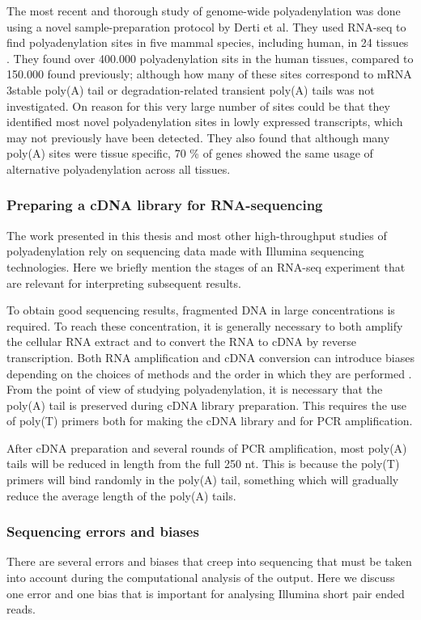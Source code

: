 The most recent and thorough study of genome-wide polyadenylation was done
using a novel sample-preparation protocol by Derti et al. They used RNA-seq to
find polyadenylation sites in five mammal species, including human, in 24
tissues \cite{derti_quantitative_2012}. They found over 400.000 polyadenylation
sits in the human tissues, compared to 150.000 found previously; although how
many of these sites correspond to mRNA 3\p stable poly(A) tail or
degradation-related transient poly(A) tails was not investigated. On reason for
this very large number of sites could be that they identified most novel
polyadenylation sites in lowly expressed transcripts, which may not previously
have been detected. They also found that although many poly(A) sites were
tissue specific, 70 \% of genes showed the same usage of alternative
polyadenylation across all tissues.

\subsubsection{Preparing a cDNA library for RNA-sequencing}
The work presented in this thesis and most other high-throughput studies of
polyadenylation rely on sequencing data made with Illumina sequencing
technologies. Here we briefly mention the stages of an RNA-seq
experiment that are relevant for interpreting subsequent results.

To obtain good sequencing results, fragmented DNA in large concentrations is
required. To reach these concentration, it is generally necessary to both
amplify the cellular RNA extract and to convert the RNA to cDNA by reverse
transcription. Both RNA amplification and cDNA conversion can introduce biases
depending on the choices of methods and the order in which they are performed
\cite{wang_rna-seq:_2009}. From the point of view of studying polyadenylation,
it is necessary that the poly(A) tail is preserved during cDNA library
preparation. This requires the use of poly(T) primers both for making the cDNA
library and for PCR amplification.

After cDNA preparation and several rounds of PCR amplification, most poly(A)
tails will be reduced in length from the full 250 nt. This is because the
poly(T) primers will bind randomly in the poly(A) tail, something which will
gradually reduce the average length of the poly(A) tails.

\subsubsection{Sequencing errors and biases}
There are several errors and biases that creep into sequencing that must be
taken into account during the computational analysis of the output. Here we
discuss one error and one bias that is important for analysing Illumina short
pair ended reads.

